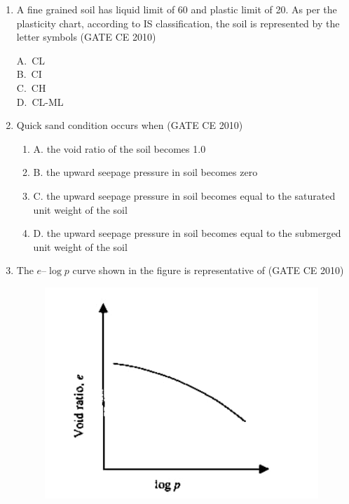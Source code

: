 \documentclass[journal,12pt,onecolumn]{exam}
\theoremstyle{remark}
\begin{document}
\begin{enumerate}
\noindent\item A fine grained soil has liquid limit of 60 and plastic limit of 20. As per the plasticity chart, according to IS classification, the soil is represented by the letter symbols 
\hfill{(GATE CE 2010)}
\begin{multicols}{4}
A.\ CL \\
B.\ CI \\
C.\ CH \\
D.\ CL-ML
\end{multicols}

\noindent\item Quick sand condition occurs when 
\hfill{(GATE CE 2010)}


\begin{enumerate}[label=]
 \item A. the void ratio of the soil becomes 1.0 
 \item B. the upward seepage pressure in soil becomes zero 
 \item C. the upward seepage pressure in soil becomes equal to the saturated unit weight of the soil 
 \item D. the upward seepage pressure in soil becomes equal to the submerged unit weight of the soil
 \end{enumerate}


\noindent\item The $e$--$\log p$ curve shown in the figure is representative of 
\hfill{(GATE CE 2010)}

\begin{figure}[H]
     \centering
     \includegraphics[scale=0.5]{figs/3e0ddfff-16d6-49d4-a917-0f59027d78f5.jpg} 
     \caption{}
     \label{fig:figure2}
 \end{figure}
    

\end{enumerate}
\end{document}
